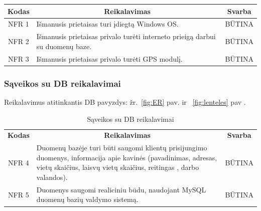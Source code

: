 \documentclass{VUMIFPSkursinis}
\begin{document}
{{{{{\begin{center}
\begin{table}[H]
\begin{tabular}{|p{2cm}|p{}|p{}|}
	\hline
		\multicolumn{1}{|c|}{{\bfseries Kodas}}&
		\multicolumn{1}{|c|}{{\bfseries Reikalavimas}}&
		\multicolumn{1}{|c|}{{\bfseries Svarba}}\\
	\hline 	
		\multicolumn{1}{|c|}{NFR 1}&
		{Išmanusis prietaisas turi įdiegtą Windows OS.}&
		\multicolumn{1}{|c|}{BŪTINA}\\	
	
	\hline 	
		\multicolumn{1}{|c|}{NFR 2}&
		{Išmanusis prietaisas privalo turėti interneto prieigą darbui su duomenų baze.}&
		\multicolumn{1}{|c|}{BŪTINA}\\	
	
	\hline 	
		\multicolumn{1}{|c|}{NFR 3}&
		{Išmanusis prietaisas privalo turėti GPS modulį.}&
		\multicolumn{1}{|c|}{BŪTINA}\\	
	
	\hline 	 	
	\end{tabular}
	
	\label{table:OSnaudojimoreikalavimai}
	\end{table}

\end{center}

\subsubsection{Sąveikos su DB reikalavimai}

Reikalavimus atitinkantis DB pavyzdys: žr.~\ref{fig:ER} pav. ir ~\ref{fig:lenteles} pav .
\begin{center}
	\begin{table}[H]
	\caption{Sąveikos su DB reikalavimai}
	\begin{tabular}{|p{2cm}|p{}|p{}|}
	\hline
	    \rowcolor{lightgray}
		\multicolumn{3}{|c|}{Sąveikos su DB reikalavimai}\\
		
	\hline
		\multicolumn{1}{|c|}{{\bfseries Kodas}}&
		\multicolumn{1}{|c|}{{\bfseries Reikalavimas}}&
		\multicolumn{1}{|c|}{{\bfseries Svarba}}\\
	\hline 	
		\multicolumn{1}{|c|}{NFR 4}&
		{Duomenų bazėje turi būti saugomi klientų prisijungimo duomenys, informacija apie kavinės (pavadinimas, adresas, vietų skaičius, laisvų vietų skaičius, reitingas , darbo valandos).}&
		\multicolumn{1}{|c|}{BŪTINA}\\	
	
	\hline 	
		\multicolumn{1}{|c|}{NFR 5}&
		{Duomenys saugomi realiciniu būdu, naudojant MySQL duomenų bazių valdymo sistemą.}&
		\multicolumn{1}{|c|}{BŪTINA}\\	
	

\end{tabular}
\end{table}
\end{center}}}}}}
\end{document}
